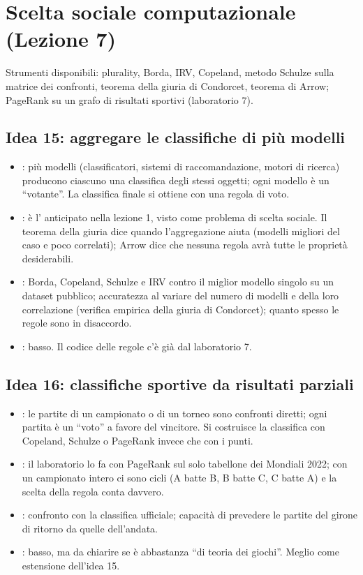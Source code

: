 \documentclass[11pt, a4paper, oneside, openany]{book}
\newcommand{\stato}[2]{\etichetta{#1}{#2}}
\newcommand{\sbloccata}[1]{\stato{blu}{DA LEZIONE #1}}
\begin{document}
\section{Scelta sociale computazionale (Lezione 7)}

Strumenti disponibili: plurality, Borda, IRV, Copeland, metodo Schulze sulla matrice dei
confronti, teorema della giuria di Condorcet, teorema di Arrow; PageRank su un grafo di
risultati sportivi (laboratorio 7).

\subsection*{Idea 15: aggregare le classifiche di più modelli \hfill\sbloccata{7}}
\begin{itemize}
  \item {}: più modelli (classificatori, sistemi di raccomandazione, motori di
        ricerca) producono ciascuno una classifica degli stessi oggetti; ogni modello è un
        ``votante''. La classifica finale si ottiene con una regola di voto.
  \item {}: è l' anticipato nella lezione 1, visto
        come problema di scelta sociale. Il teorema della giuria dice quando l'aggregazione
        aiuta (modelli migliori del caso e poco correlati); Arrow dice che nessuna regola
        avrà tutte le proprietà desiderabili.
  \item {}: Borda, Copeland, Schulze e IRV contro il miglior modello singolo
        su un dataset pubblico; accuratezza al variare del numero di modelli e della loro
        correlazione (verifica empirica della giuria di Condorcet); quanto spesso le regole
        sono in disaccordo.
  \item {}: basso. Il codice delle regole c'è già dal laboratorio 7.
\end{itemize}

\subsection*{Idea 16: classifiche sportive da risultati parziali \hfill\sbloccata{7}}
\begin{itemize}
  \item {}: le partite di un campionato o di un torneo sono confronti diretti;
        ogni partita è un ``voto'' a favore del vincitore. Si costruisce la classifica con
        Copeland, Schulze o PageRank invece che con i punti.
  \item {}: il laboratorio lo fa con PageRank sul solo tabellone
        dei Mondiali 2022; con un campionato intero ci sono cicli (A batte B, B batte C,
        C batte A) e la scelta della regola conta davvero.
  \item {}: confronto con la classifica ufficiale; capacità di prevedere le
        partite del girone di ritorno da quelle dell'andata.
  \item {}: basso, ma da chiarire se è abbastanza ``di teoria dei giochi''.
        Meglio come estensione dell'idea 15.
\end{itemize}
\end{document}
